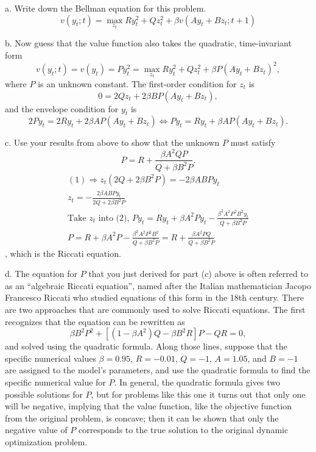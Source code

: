 \documentclass[12pt]{article}
\begin{document}
\begin{description}
\item a. Write down the Bellman equation for this problem.
$$
v(y_t;t) = \max_{z_t}Ry_t^2 + Qz_t^2 + \beta v(Ay_t+ Bz_t;t+1)
$$
\item b. Now guess that the value function also takes the quadratic, time-invariant form
$$
v(y_{t};t) = v(y_{t}) = Py_{t}^{2} = \max_{z_t}Ry_t^2 + Qz_t^2 + \beta P(Ay_t + Bz_t)^2 ,
$$
where $P$ is an unknown constant. The first-order condition for $z_{t}$ is 
\begin{equation}
0 = 2Qz_t + 2\beta BP(Ay_t + Bz_t), 
\end{equation}
and the envelope condition for $y_{t}$ is 
\begin{equation}
2Py_t = 2Ry_t + 2\beta AP(Ay_t + Bz_t) \iff Py_t = Ry_t + \beta AP(Ay_t + Bz_t). 
\end{equation}
\item c. Use your results from above to show that the unknown $P$ must satisfy
$$
P = R + \frac{\beta A^{2}QP}{Q+\beta B^{2} P}.
$$
\begin{gather*}
(1) \Rightarrow z_t(2Q + 2\beta B^2P) = -2\beta ABPy_t    \\ 
z_t = -\frac{2\beta ABPy_t}{2Q + 2\beta B^2P} \\ 
\text{Take $z_t$ into (2), } Py_t = Ry_t + \beta A^2Py_t - \frac{\beta^2A^2P^2B^2y_t}{Q + \beta B^2P} \\ 
P = R + \beta A^2P - \frac{\beta^2A^2P^2B^2}{Q + \beta B^2P} = R + \frac{\beta A^2PQ}{Q+\beta B^2P}
\end{gather*}, which is the Riccati equation. 
\item d. The equation for $P$ that you just derived for part (c) above is often referred to as an ``algebraic Riccati equation'', named after the Italian mathematician Jacopo Francesco Riccati who studied equations of this form in the 18th century. There are two approaches that are commonly used to solve Riccati equations. The first recognizes that the equation can be rewritten as
$$
\beta B^{2} P^{2} + [(1-\beta A^{2})Q-\beta B^{2}R]P - QR = 0,
$$
and solved using the quadratic formula. Along those lines, suppose that the specific numerical values $\beta=0.95$, $R=-0.01$, $Q=-1$, $A=1.05$, and $B=-1$ are assigned to the model's parameters, and use the quadratic formula to find the specific numerical value for $P$. In general, the quadratic formula gives two possible solutions for $P$, but for problems like this one it turns out that only one will be negative, implying that the value function, like the objective function from the original problem, is concave; then it can be shown that only the negative value of $P$ corresponds to the true solution to the original dynamic optimization problem.
\end{description}
\end{document}
